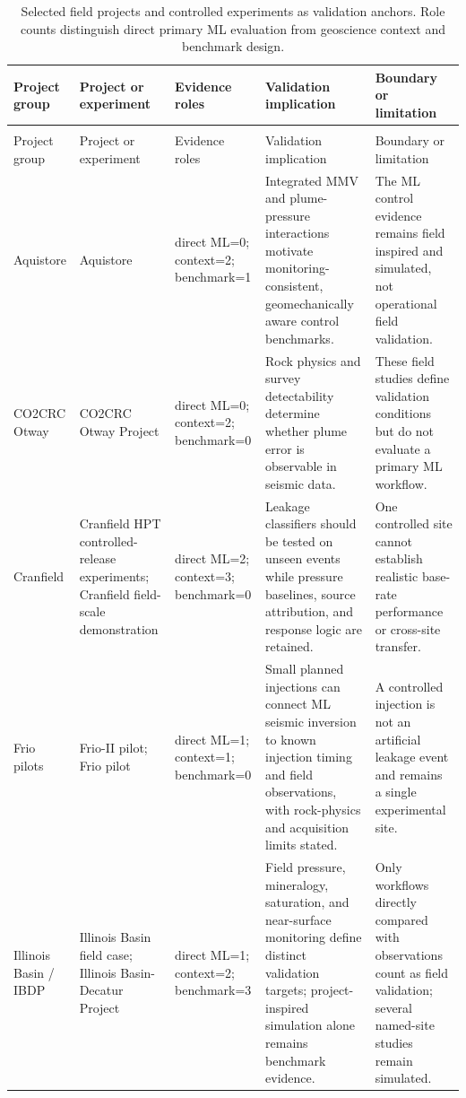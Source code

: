 \begingroup
\small
\setlength{\tabcolsep}{3pt}
\begin{longtable}{>{\RaggedRight\arraybackslash}p{} >{\RaggedRight\arraybackslash}p{} >{\RaggedRight\arraybackslash}p{} >{\RaggedRight\arraybackslash}p{} >{\RaggedRight\arraybackslash}p{}}
\caption{Selected field projects and controlled experiments as validation anchors. Role counts distinguish direct primary ML evaluation from geoscience context and benchmark design.}\label{tab:field-anchors}\\
\toprule
Project group & Project or experiment & Evidence roles & Validation implication & Boundary or limitation \\
\midrule
\endfirsthead
\multicolumn{5}{c}{\tablename\ \thetable{} -- continued}\\
\toprule
Project group & Project or experiment & Evidence roles & Validation implication & Boundary or limitation \\
\midrule
\endhead
\bottomrule
\endfoot
Aquistore & Aquistore & direct ML=0; context=2; benchmark=1 & Integrated MMV and plume-pressure interactions motivate monitoring-consistent, geomechanically aware control benchmarks. & The ML control evidence remains field inspired and simulated, not operational field validation. \\
CO2CRC Otway & CO2CRC Otway Project & direct ML=0; context=2; benchmark=0 & Rock physics and survey detectability determine whether plume error is observable in seismic data. & These field studies define validation conditions but do not evaluate a primary ML workflow. \\
Cranfield & Cranfield HPT controlled-release experiments; Cranfield field-scale demonstration & direct ML=2; context=3; benchmark=0 & Leakage classifiers should be tested on unseen events while pressure baselines, source attribution, and response logic are retained. & One controlled site cannot establish realistic base-rate performance or cross-site transfer. \\
Frio pilots & Frio-II pilot; Frio pilot & direct ML=1; context=1; benchmark=0 & Small planned injections can connect ML seismic inversion to known injection timing and field observations, with rock-physics and acquisition limits stated. & A controlled injection is not an artificial leakage event and remains a single experimental site. \\
Illinois Basin / IBDP & Illinois Basin field case; Illinois Basin-Decatur Project & direct ML=1; context=2; benchmark=3 & Field pressure, mineralogy, saturation, and near-surface monitoring define distinct validation targets; project-inspired simulation alone remains benchmark evidence. & Only workflows directly compared with observations count as field validation; several named-site studies remain simulated. \\

\end{longtable}
